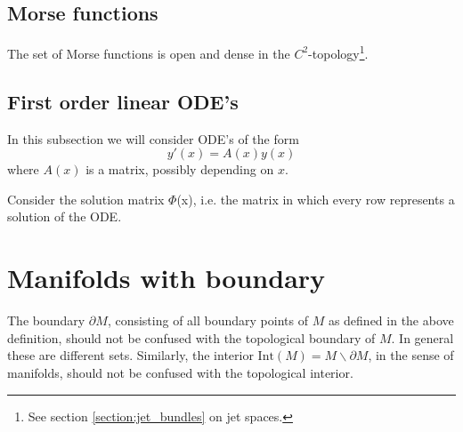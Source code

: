 \subsection{Morse functions}

	\begin{property}
		The set of Morse functions is open and dense in the $C^2$-topology\footnote{See section \ref{section:jet_bundles} on jet spaces.}.
	\end{property}
	
\subsection{First order linear ODE's}

	In this subsection we will consider ODE's of the form
	\begin{equation}
		y'(x) = A(x)y(x)
	\end{equation}
	where $A(x)$ is a matrix, possibly depending on $x$.
	
	\begin{formula}[Liouville]
		Consider the solution matrix $\Phi$(x), i.e. the matrix in which every row represents a solution of the ODE.
	\end{formula}

\section{Manifolds with boundary}

	\begin{remark}
		The boundary $\partial M$, consisting of all boundary points of $M$ as defined in the above definition, should not be confused with the topological boundary of $M$. In general these are different sets. Similarly, the interior $\text{Int}(M) = M \backslash\partial M$, in the sense of manifolds, should not be confused with the topological interior.
	\end{remark}
	
